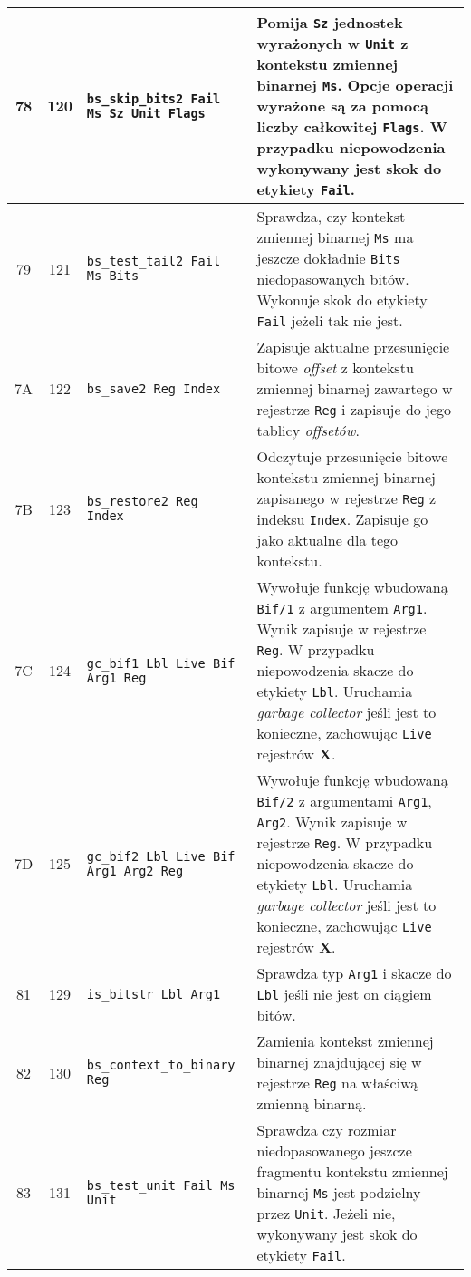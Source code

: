 \begin{longtable}{|c|c|p{5cm}|p{7cm}|}
\hline
78 & 120 & \texttt{bs\_skip\_bits2 Fail Ms Sz Unit Flags} & Pomija \texttt{Sz} jednostek wyrażonych w \texttt{Unit} z kontekstu zmiennej binarnej \texttt{Ms}. Opcje operacji wyrażone są za pomocą liczby całkowitej \texttt{Flags}. W przypadku niepowodzenia wykonywany jest skok do etykiety \texttt{Fail}. \\
\hline
79 & 121 & \texttt{bs\_test\_tail2 Fail Ms Bits} & Sprawdza, czy kontekst zmiennej binarnej \texttt{Ms} ma jeszcze dokładnie \texttt{Bits} niedopasowanych bitów. Wykonuje skok do etykiety \texttt{Fail} jeżeli tak nie jest.  \\
\hline
7A & 122 & \texttt{bs\_save2 Reg Index} & Zapisuje aktualne przesunięcie bitowe \emph{offset} z kontekstu zmiennej binarnej zawartego w rejestrze \texttt{Reg} i zapisuje do jego tablicy \emph{offsetów}.\\
\hline
7B & 123 & \texttt{bs\_restore2 Reg Index} & Odczytuje przesunięcie bitowe kontekstu zmiennej binarnej zapisanego w rejestrze \texttt{Reg} z indeksu \texttt{Index}. Zapisuje go jako aktualne dla tego kontekstu. \\
\hline
7C & 124 & \texttt{gc\_bif1 Lbl Live Bif Arg1 Reg} & Wywołuje funkcję wbudowaną \texttt{Bif/1} z argumentem \texttt{Arg1}. Wynik zapisuje w rejestrze \texttt{Reg}. W przypadku niepowodzenia skacze do etykiety \texttt{Lbl}. Uruchamia \emph{garbage collector} jeśli jest to konieczne, zachowując \texttt{Live} rejestrów \textbf{X}.\\
\hline
7D & 125 & \texttt{gc\_bif2 Lbl Live Bif Arg1 Arg2 Reg} & Wywołuje funkcję wbudowaną \texttt{Bif/2} z argumentami \texttt{Arg1}, \texttt{Arg2}. Wynik zapisuje w rejestrze \texttt{Reg}. W przypadku niepowodzenia skacze do etykiety \texttt{Lbl}. Uruchamia \emph{garbage collector} jeśli jest to konieczne, zachowując \texttt{Live} rejestrów \textbf{X}.  \\
\hline
81 & 129 & \texttt{is\_bitstr Lbl Arg1} & Sprawdza typ \texttt{Arg1} i skacze do \texttt{Lbl} jeśli nie jest on ciągiem bitów.\\
\hline
82 & 130 & \texttt{bs\_context\_to\_binary Reg} & Zamienia kontekst zmiennej binarnej znajdującej się w rejestrze \texttt{Reg} na właściwą zmienną binarną.\\
\hline
83 & 131 & \texttt{bs\_test\_unit Fail Ms Unit} & Sprawdza czy rozmiar niedopasowanego jeszcze fragmentu kontekstu zmiennej binarnej \texttt{Ms} jest podzielny przez \texttt{Unit}. Jeżeli nie, wykonywany jest skok do etykiety \texttt{Fail}. \\
\hline

\end{longtable}
